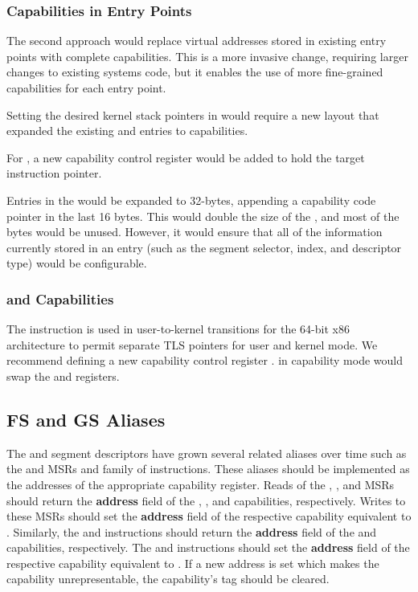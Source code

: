 \subsubsection{Capabilities in Entry Points}

The second approach would replace virtual addresses stored in
existing entry points with complete capabilities.  This is a more
invasive change, requiring larger changes to existing systems code, but
it enables the use of more fine-grained capabilities for each entry
point.

Setting the desired kernel stack pointers in \CSP{} would require a new
\TSS{} layout that expanded the existing \RSP{} and \IST{} entries to
capabilities.

For , a new capability control register \CSTAR{} would be
added to hold the target instruction pointer.

Entries in the \IDT{} would be expanded to 32-bytes, appending a capability
code pointer in the last 16 bytes.  This would double the size of the
\IDT{}, and most of the bytes would be unused.  However, it would
ensure that all of the information currently stored in an \IDT{} entry
(such as the segment selector, \IST{} index, and descriptor type) would
be configurable.

\subsubsection{ and Capabilities}

The  instruction is used in user-to-kernel
transitions for the 64-bit x86 architecture to permit separate TLS
pointers for user and kernel mode.  We recommend defining a new
capability control register \KGS{}.   in capability
mode would swap the \CGS{} and \KGS{} registers.

\subsection{FS and GS Aliases}

The \FS{} and \GS{} segment descriptors have grown several related
aliases over time such as the \FSBASE{} and \GSBASE{} MSRs and
 family of instructions.  These aliases should be
implemented as the addresses of the appropriate capability register.
Reads of the \FSBASE{}, \GSBASE{}, and \KGSBASE{} MSRs should return
the \textbf{address} field of the \CFS{}, \CGS{}, and \KGS{} capabilities,
respectively.  Writes to these MSRs should set the \textbf{address} field of the
respective capability equivalent to .  Similarly,
the  and  instructions should
return the \textbf{address} field of the \CFS{} and \CGS{} capabilities,
respectively.  The  and 
instructions should set the \textbf{address} field of the respective capability
equivalent to .  If a new address is set which makes
the capability unrepresentable, the capability's tag should be
cleared.


